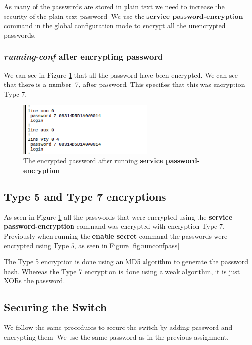 \documentclass{article}
\begin{document}
As many of the passwords are stored in plain text we need to increase the security of the plain-text password. We use the \textbf{service password-encryption} command in the global configuration mode to encrypt all the unencrypted passwords. 

\subsubsection{\textit{running-conf} after encrypting password}

We can see in Figure \ref{fig:encpasses} that all the password have been encrypted. We can see that there is a number, 7, after password. This specifies that this was encryption Type 7.  

\begin{figure}[h]
    \centering
    \includegraphics[width=0.6\textwidth]{imgs/encpasses}
    \caption{The encrypted password after running \textbf{service password-encryption}}
    \label{fig:encpasses}
\end{figure}

\subsection{Type 5 and Type 7 encryptions}

As seen in Figure \ref{fig:encpasses} all the passwords that were encrypted using the \textbf{service password-encryption} command was encrypted with encryption Type 7. Previously when running the \textbf{enable secret} command the passwords were encrypted using Type 5, as seen in Figure \ref{fig:runconfpass}.

The Type 5 encryption is done using an MD5 algorithm to generate the password hash. Whereas the Type 7 encryption is done using a weak algorithm, it is just XORs the password.

\subsection{Securing the Switch}

We follow the same procedures to secure the switch by adding password and encrypting them. We use the same password as in the previous assignment.
\end{document}
